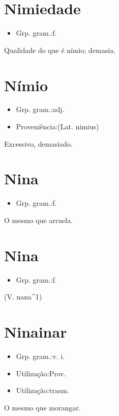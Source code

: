 \section{Nimiedade}
\begin{itemize}
\item {Grp. gram.:f.}
\end{itemize}
Qualidade do que é nímio; demasia.
\section{Nímio}
\begin{itemize}
\item {Grp. gram.:adj.}
\end{itemize}
\begin{itemize}
\item {Proveniência:(Lat. \textunderscore nimius\textunderscore )}
\end{itemize}
Excessivo, demasiado.
\section{Nina}
\begin{itemize}
\item {Grp. gram.:f.}
\end{itemize}
O mesmo que \textunderscore arruela\textunderscore .
\section{Nina}
\begin{itemize}
\item {Grp. gram.:f.}
\end{itemize}
(V. \textunderscore nana\textunderscore ^1)
\section{Ninainar}
\begin{itemize}
\item {Grp. gram.:v. i.}
\end{itemize}
\begin{itemize}
\item {Utilização:Prov.}
\end{itemize}
\begin{itemize}
\item {Utilização:trasm.}
\end{itemize}
O mesmo que \textunderscore morangar\textunderscore .
